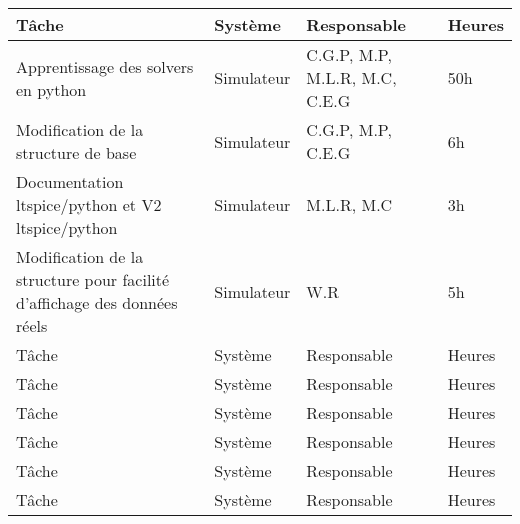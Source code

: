 \begin{tabularx}{\linewidth}{
    |>{\hsize=2.5\hsize}X|%
    >{\hsize=0.5\hsize}X|%
    >{\hsize=0.75\hsize}X|%
    >{\hsize=0.25\hsize}X|%
  }
    \hline
    \textbf{Tâche} & \textbf{Système} & \textbf{Responsable} & \textbf{Heures}\\\hline
     Apprentissage des solvers en python & Simulateur & C.G.P, M.P, M.L.R, M.C, C.E.G & 50h\\\hline
     Modification de la structure de base   & Simulateur &  C.G.P, M.P, C.E.G & 6h\\\hline
     Documentation ltspice/python et V2 ltspice/python  & Simulateur & M.L.R, M.C & 3h\\\hline
     Modification de la structure pour facilité d'affichage des données réels  & Simulateur & W.R & 5h\\\hline
     Tâche & Système & Responsable & Heures\\\hline
     Tâche & Système & Responsable & Heures\\\hline
     Tâche & Système & Responsable & Heures\\\hline
     Tâche & Système & Responsable & Heures\\\hline
     Tâche & Système & Responsable & Heures\\\hline
     Tâche & Système & Responsable & Heures\\\hline
  \end{tabularx}

%
%
%  